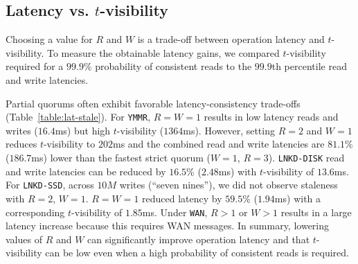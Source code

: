 \documentclass{vldb}
\newcommand{\subsectionskip}{-0em}
\begin{document}
\vspace{\subsectionskip}\subsection{Latency vs. {\large $t$}-visibility}

Choosing a value for $R$ and $W$ is a trade-off between operation
latency and $t$-visibility. To measure the obtainable latency gains,
we compared $t$-visibility required for a $99.9\%$ probability of
consistent reads to the $99.9$th percentile read and write latencies.

Partial quorums often exhibit favorable latency-consistency trade-offs
(Table~\ref{table:lat-stale}).  For \texttt{YMMR}, $R$$=$$W$$=$$1$
results in low latency reads and writes ($16.4$ms) but high
$t$-visibility ($1364$ms). However, setting $R$$=$$2$ and $W$$=$$1$
reduces $t$-visibility to $202$ms and the combined read and write
latencies are $81.1\%$ ($186.7$ms) lower than the fastest strict
quorum ($W$$=$$1$, $R$$=$$3$).  \texttt{LNKD-DISK} read and write
latencies can be reduced by $16.5\%$ ($2.48$ms) with $t$-visibility of
$13.6$ms.  For \texttt{LNKD-SSD}, across $10M$ writes (``seven
nines''), we did not observe staleness with $R$$=$$2$, $W$$=$$1$.
$R$$=$$W$$=$$1$ reduced latency by $59.5\%$ ($1.94$ms) with a
corresponding $t$-visibility of $1.85$ms.  Under \texttt{WAN}, $R > 1$
or $W > 1$ results in a large latency increase because this requires
WAN messages. In summary, lowering values of $R$ and $W$ can
significantly improve operation latency and that $t$-visibility can be
low even when a high probability of consistent reads is required.
\end{document}
